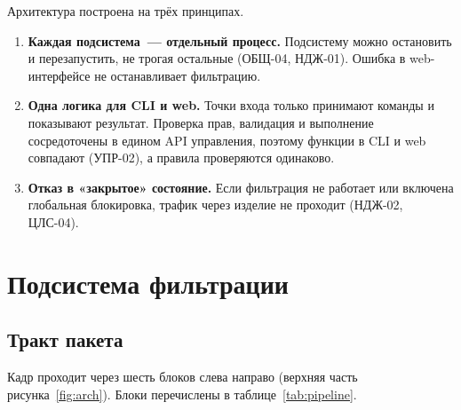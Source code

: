 \documentclass[12pt,a4paper,final]{article}
\begin{document}
Архитектура построена на трёх принципах.
\begin{enumerate}[label=\arabic*)]
\item \textbf{Каждая подсистема~— отдельный процесс.} Подсистему можно
  остановить и перезапустить, не трогая остальные (ОБЩ-04, НДЖ-01). Ошибка
  в web-интерфейсе не останавливает фильтрацию.
\item \textbf{Одна логика для CLI и web.} Точки входа только принимают команды
  и показывают результат. Проверка прав, валидация и выполнение сосредоточены
  в едином API управления, поэтому функции в CLI и web совпадают (УПР-02),
  а правила проверяются одинаково.
\item \textbf{Отказ в «закрытое» состояние.} Если фильтрация не работает или
  включена глобальная блокировка, трафик через изделие не проходит (НДЖ-02,
  ЦЛС-04).
\end{enumerate}

\section{Подсистема фильтрации}\label{sec:filter}

\subsection{Тракт пакета}

Кадр проходит через шесть блоков слева направо (верхняя часть
рисунка~\ref{fig:arch}). Блоки перечислены в таблице~\ref{tab:pipeline}.
\end{document}
